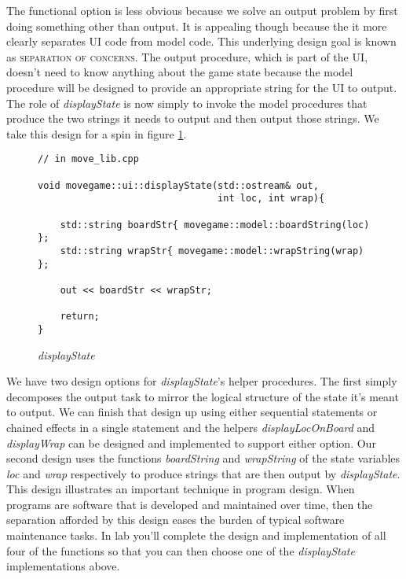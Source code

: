 \documentclass[nobib]{tufte-handout}
\begin{document}
The functional option is less obvious because we solve an output problem by first doing something other than output. It is appealing though because the it more clearly separates UI code from model code. This underlying design goal is known as \textsc{separation of concerns}. The output procedure, which is part of the UI, doesn't need to know anything about the game state because the model procedure will be designed to provide an appropriate string for the UI to output. The role of \textit{displayState} is now simply to invoke the model procedures that produce the two strings it needs to output and then output those strings. We take this design for a spin in figure \ref{fig:display-func}. 

\begin{figure}[!htbp]
\begin{lstlisting}
// in move_lib.cpp

void movegame::ui::displayState(std::ostream& out,
	                            int loc, int wrap){

	std::string boardStr{ movegame::model::boardString(loc) };
	std::string wrapStr{ movegame::model::wrapString(wrap) };
	
	out << boardStr << wrapStr;

	return;	                            
}	       

\end{lstlisting}
\caption{\textit{displayState} }
\label{fig:display-func}
\end{figure}

We have two design options for \textit{displayState}'s helper procedures. The first simply decomposes the output task to mirror the logical structure of the state it's meant to output. We can finish that design up using either sequential statements or chained effects in a single statement and the helpers \textit{displayLocOnBoard} and \textit{displayWrap} can be designed and implemented to support either option. Our second design uses the functions \textit{boardString} and \textit{wrapString} of the state variables \textit{loc} and \textit{wrap} respectively to produce strings that are then output by \textit{displayState}. This design illustrates an important technique in program design. When programs are software that is developed and maintained over time, then the separation afforded by this design eases the burden of typical software maintenance tasks. In lab you'll complete the design and implementation of all four of the functions so that you can then choose one of the \textit{displayState} implementations above. 
\end{document}
